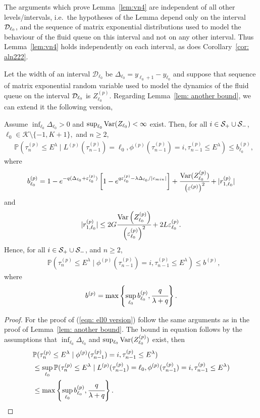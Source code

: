 The arguments which prove Lemma~\ref{lem:vn4} are independent of all other levels/intervals, i.e.~the hypotheses of the Lemma depend only on the interval \(\mathcal{D}_{\ell_0}\), and the sequence of matrix exponential distributions used to model the behaviour of the fluid queue on this interval and not on any other interval. Thus Lemma~\ref{lem:vn4} holds independently on each interval, as does Corollary~\ref{cor: aln222}.

Let the width of an interval \(\mathcal D_{\ell_0}\) be \(\Delta_{\ell_0}=y_{\ell_0+1}-y_{\ell_0}\) and suppose that sequence of matrix exponential random variable used to model the dynamics of the fluid queue on the interval \(\mathcal{D}_{\ell_0}\) is \(Z_{\ell_0}^{(p)}\). Regarding Lemma~\ref{lem: another bound}, we can extend it the following version, 
\begin{lem}\label{lem: another bound sdfg}
	Assume \(\inf_{\ell_0}\Delta_{\ell_0}>0\) and \(\sup_{\ell_0}\mathrm{Var}(Z_{\ell_0})<\infty\) exist. Then, for all \(i\in\mathcal S_+\cup \mathcal{S}_-\), \(\ell_0\in\mathcal K\setminus\{-1,K+1\},\) and \(n\geq 2\), 
	\begin{align}
		&\mathbb P(\tau_n^{(p)}\leq E^\lambda \mid L^{(p)}(\tau_{n-1}^{(p)}) = \ell_0, \phi^{(p)}(\tau_{n-1}^{(p)})=i, \tau_{n-1}^{(p)}\leq  E^\lambda ) \leq b_{\ell_0}^{(p)},\label{eqn: ell0 version}
	\end{align}
	where 
	\[b_{\ell_0}^{(p)} = 1-e^{-q(\Delta_{\ell_0}+\varepsilon_{\ell_0}^{(p)})}\left[1-e^{q\varepsilon_{\ell_0}^{(p)}-\lambda \Delta_{\ell_0}/|c_{min}|}\right] + \cfrac{\mathrm{Var}(Z_{\ell_0}^{(p)})}{\left(\varepsilon^{(p)}\right)^2} + |r_{1,\ell_0}^{(p)}| \]
	and  
	\[|r_{1,\ell_0}^{(p)}|\leq 2G\cfrac{\mathrm{Var} \left(Z_{\ell_0}^{(p)}\right)}{\left(\varepsilon_{\ell_0}^{(p)}\right)^2} + 2L\varepsilon_{\ell_0}^{(p)}.\]
	Hence, for all \(i\in\mathcal S_+\cup \mathcal{S}_-\), and \(n\geq 2\), 
	\begin{align}
		&\mathbb P(\tau_n^{(p)}\leq E^\lambda \mid \phi^{(p)}(\tau_{n-1}^{(p)})=i, \tau_{n-1}^{(p)}\leq  E^\lambda ) \leq b^{(p)}, \label{eqn: skjhg}
	\end{align}
	where 
	\[b^{(p)} = \max\left\{\sup_{\ell_0}b_{\ell_0}^{(p)}, \cfrac{q}{\lambda + q}\right\}.\]
\end{lem}
\begin{proof}
	For the proof of (\ref{eqn: ell0 version}) follow the same arguments as in the proof of Lemma~\ref{lem: another bound}. The bound in equation follows by the assumptions that \(\inf_{\ell_0}\Delta_{\ell_0}\) and \(\sup_{\ell_0}\mathrm{Var}(Z_{\ell_0}^{(p)})\) exist, then 
	\begin{align*}
		&\mathbb P(\tau_n^{(p)}\leq E^\lambda \mid \phi^{(p)}(\tau_{n-1}^{(p)})=i, \tau_{n-1}^{(p)}\leq  E^\lambda ) 
		\\&\leq \sup_{\ell_0} \mathbb P(\tau_n^{(p)}\leq E^\lambda \mid L^{(p)}(\tau_{n-1}^{(p)}) = \ell_0, \phi^{(p)}(\tau_{n-1}^{(p)})=i, \tau_{n-1}^{(p)}\leq  E^\lambda ) 
		\\&\leq \max\left\{\sup_{\ell_0}b_{\ell_0}^{(p)}, \cfrac{q}{\lambda + q}\right\}.\label{eqn: ell0 versionlskhg}
	\end{align*}
\end{proof}
